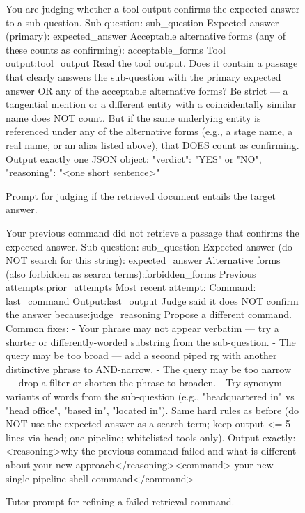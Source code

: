 \documentclass{article} %
\begin{document}
\begin{figure}[!t]
\begin{promptbox}
You are judging whether a tool output confirms the expected answer to a sub-question.
Sub-question: {sub_question}
Expected answer (primary): {expected_answer}
Acceptable alternative forms (any of these counts as confirming): {acceptable_forms}
Tool output:{tool_output}
Read the tool output. Does it contain a passage that clearly answers the sub-question with the primary expected answer OR any of the acceptable alternative forms? Be strict — a tangential mention or a different entity with a coincidentally similar name does NOT count. But if the same underlying entity is referenced under any of the alternative forms (e.g., a stage name, a real name, or an alias listed above), that DOES count as confirming.
Output exactly one JSON object:
{{"verdict": "YES" or "NO", "reasoning": "<one short sentence>"}}
\end{promptbox}
\vspace{-0.4cm}
\caption{Prompt for judging if the retrieved document entails the target answer.}
\label{fig:prompt_judge}
\end{figure}

\begin{figure}[!t]
\begin{promptbox}
Your previous command did not retrieve a passage that confirms the expected answer.
Sub-question: {sub_question}
Expected answer (do NOT search for this string): {expected_answer}
Alternative forms (also forbidden as search terms):{forbidden_forms}
Previous attempts:{prior_attempts}
Most recent attempt: Command: {last_command} Output:{last_output}
Judge said it does NOT confirm the answer because:{judge_reasoning}
Propose a different command. Common fixes:
- Your phrase may not appear verbatim — try a shorter or differently-worded substring from the sub-question.
- The query may be too broad — add a second piped rg with another distinctive phrase to AND-narrow.
- The query may be too narrow — drop a filter or shorten the phrase to broaden.
- Try synonym variants of words from the sub-question (e.g., "headquartered in" vs "head office", "based in", "located in").
Same hard rules as before (do NOT use the expected answer as a search term; keep output <= 5 lines via head; one pipeline; whitelisted tools only).
Output exactly:<reasoning>why the previous command failed and what is different about your new approach</reasoning><command>
your new single-pipeline shell command</command>
\end{promptbox}
\vspace{-0.4cm}
\caption{Tutor prompt for refining a failed retrieval command.}
\label{fig:prompt_backward_refine}
\end{figure}
\end{document}

